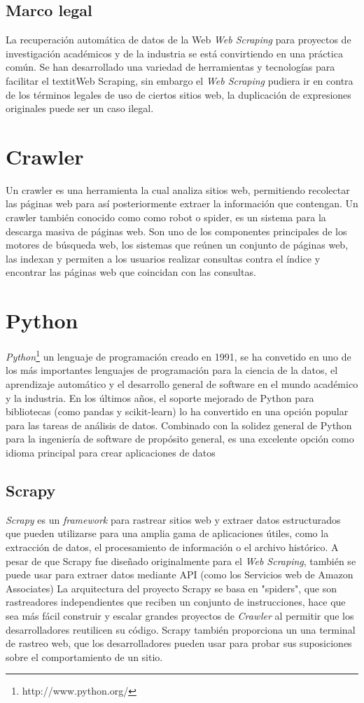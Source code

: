 \subsection{Marco legal}
La recuperación automática de datos de la Web \textit{Web Scraping} para proyectos de investigación académicos y de la 
industria se está convirtiendo en una práctica común. Se han desarrollado una variedad de herramientas y tecnologías 
para facilitar el textit{Web Scraping}, sin embargo el \textit{Web Scraping} pudiera ir en contra de los términos legales 
de uso de ciertos sitios web, la duplicación de expresiones originales puede ser un caso ilegal.


\section{Crawler}
Un crawler \citep{CT14} es una herramienta la cual analiza sitios web, permitiendo recolectar 
las páginas web para así posteriormente extraer la información que contengan. Un crawler también 
conocido como como robot o spider, es un sistema para la descarga masiva de páginas web. Son uno de 
los componentes principales de los motores de búsqueda web, los sistemas que reúnen un conjunto de 
páginas web, las indexan y permiten a los usuarios realizar consultas contra el índice y encontrar las 
páginas web que coincidan con las consultas.

\section{Python}
\textit{Python}\footnote{http://www.python.org/} un lenguaje de programación creado en 1991, se ha convetido en uno de los más 
importantes lenguajes de programación para la ciencia de la datos, el aprendizaje automático y el desarrollo general de software en 
el mundo académico y la industria. 
En los últimos años, el soporte mejorado de Python para bibliotecas (como pandas y scikit-learn) lo ha convertido en una opción popular 
para las tareas de análisis de datos. Combinado con la solidez general de Python para la ingeniería de software de propósito general, 
es una excelente opción como idioma principal para crear aplicaciones de datos %

\subsection{Scrapy}
\textit{Scrapy} es un \textit{framework} para rastrear sitios web y extraer datos estructurados que pueden utilizarse para una amplia 
gama de aplicaciones útiles, como la extracción de datos, el procesamiento de información o el archivo histórico.
A pesar de que Scrapy fue diseñado originalmente para el \textit{Web Scraping}, también se puede usar para extraer datos mediante 
API (como los Servicios web de Amazon Associates) %
La arquitectura del proyecto Scrapy se basa en "spiders", que son rastreadores independientes que reciben un conjunto de instrucciones,
hace que sea más fácil construir y escalar grandes proyectos de \textit{Crawler} al permitir que los desarrolladores reutilicen su 
código. Scrapy también proporciona un una terminal de rastreo web, que los desarrolladores pueden usar para probar sus suposiciones 
sobre el comportamiento de un sitio.
